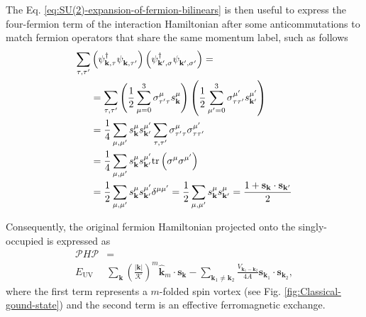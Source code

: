 \documentclass[english,aps,prd,nofootinbib,twocolumn]{revtex4-1}
\begin{document}
The Eq. \eqref{eq:SU(2)-expansion-of-fermion-bilinears}
is then useful to express the four-fermion term of the interaction Hamiltonian after some anticommutations to match fermion operators that share the same momentum label, such as follows
\begin{equation}
\begin{split}
\sum_{\tau ,\tau'}&
\left(\psi_{\mathbf{k ,\tau   }}^{\textcolor{black}{\dagger}}
\psi_{\mathbf{k ,\tau'  }}^{\textcolor{white}{\dagger}}\right)
\left(\psi_{\mathbf{k',\sigma }}^{\textcolor{black}{\dagger}}
\psi_{\mathbf{k',\sigma'}}^{\textcolor{white}{\dagger}}\right)
 = \\ &=
\sum_{\tau ,\tau'}
\left(
\frac{1}{2} 
\sum_{\mu =0}^{3} 
\sigma^{\mu }_{\tau'\tau }s^{\mu }_{\mathbf{k }}
\right)
\left(
\frac{1}{2} 
\sum_{\mu'=0}^{3} 
\sigma^{\mu'}_{\tau \tau'}s^{\mu'}_{\mathbf{k'}}
\right) \\ &=
\frac{1}{4}
\sum_{\mu ,\mu'}
s^{\mu }_{\mathbf{k }}
s^{\mu'}_{\mathbf{k'}}
\sum_{\tau ,\tau'}
\sigma^{\mu }_{\tau'\tau }
\sigma^{\mu'}_{\tau \tau'}
 \\ &=
\frac{1}{4}
\sum_{\mu ,\mu'}
s^{\mu }_{\mathbf{k }}
s^{\mu'}_{\mathbf{k'}}
\mathrm{tr}\left( \sigma^{\mu }\sigma^{\mu'} \right)
\\ &=
\frac{1}{2}
\sum_{\mu ,\mu'}
s^{\mu }_{\mathbf{k }}
s^{\mu'}_{\mathbf{k'}}
\delta^{\mu \mu'}
=
\frac{1}{2}
\sum_{\mu ,\mu'}
s^{\mu }_{\mathbf{k }}
s^{\mu }_{\mathbf{k'}}
=
\frac{
1 + 
\mathbf{s}_{\mathbf{k }}
\cdot
\mathbf{s}_{\mathbf{k'}}
}{2}
\end{split}
\end{equation}

Consequently, the original fermion Hamiltonian projected onto the singly-occupied is expressed as
\begin{equation}
\label{eq:Effective-Heisenberg-Hamiltonian}
\begin{split}
\mathcal{P} H \mathcal{P} &= \\
E_{\mathrm{UV} }&
\sum_{\mathbf{k }} \left(\frac{|\mathbf{k}|}{\mathcal{K}}\right)^{m}
\!\! 
\hat{\mathbf{k}}_{m}\!\! \cdot \mathbf{s}_{\mathbf{k }} - 
\sum_{\mathbf{k}_{1} \neq \mathbf{k}_{2}}
\frac{V_{\mathbf{k}_{1}-\mathbf{k}_{2}}}{4A}
\mathbf{s}_{\mathbf{k}_{1}}\!\!
\cdot
\mathbf{s}_{\mathbf{k}_{2}}
,
\end{split}
\end{equation}
where the first term represents a $m$-folded spin vortex (see Fig. \ref{fig:Classical-gound-state}) and the second term is an effective ferromagnetic exchange. 
\end{document}
